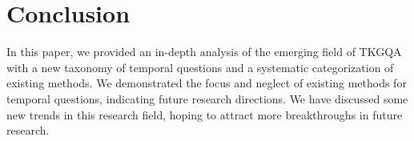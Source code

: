 \section{Conclusion\label{conclusion}}
In this paper, we provided an in-depth analysis of the emerging field of TKGQA with a new taxonomy of temporal questions and a systematic categorization of existing methods. We demonstrated the focus and neglect of existing methods for temporal questions, indicating future research directions. We have discussed some new trends in this research field, hoping to attract more breakthroughs in future research.

